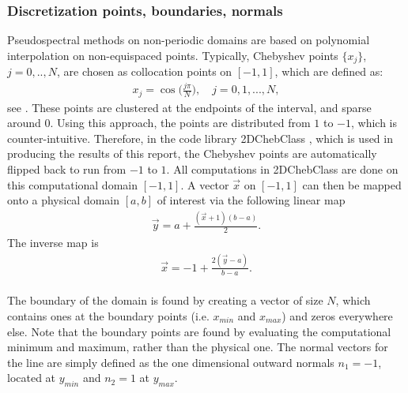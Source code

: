 \subsubsection{Discretization points, boundaries, normals}
Pseudospectral methods on non-periodic domains are based on polynomial interpolation on non-equispaced points.  
Typically, Chebyshev points $\{x_j\}$, $j = 0,..,N$, are chosen as collocation points on $[-1,1]$, which are defined as:
\begin{align}\label{defChebyshevPoints}
	x_j= \cos\bigg(\frac{j \pi}{N}\bigg), \quad j=0,1,...,N,
\end{align}	
see \cite{bibTrefethen}.
These points are clustered at the endpoints of the interval, and sparse around $0$. Using this approach, the points are distributed from $1$ to $-1$, which is counter-intuitive. Therefore, in the code library 2DChebClass \cite{GoddardPseudospectralCode1}, which is used in producing the results of this report, the Chebyshev points are automatically flipped back to run from $-1$ to $1$. All computations in 2DChebClass are done on this computational domain $[-1,1]$. A vector $\vec x$ on $[-1,1]$ can then be mapped onto a physical domain $[a,b]$ of interest via the following linear map
\begin{align}\label{eq:linearmap}
\vec y = a + \frac{(\vec x+1)(b-a)}{2}.  
\end{align}
The inverse map is 
\begin{align}\label{eq:invlinearmap}
\vec x = -1 + \frac{2(\vec y-a)}{b-a}.
\end{align}
\\
The boundary of the domain is found by creating a vector of size $N$, which contains ones at the boundary points (i.e. $x_{min}$ and $x_{max}$) and zeros everywhere else. Note that the boundary points are found by evaluating the computational minimum and maximum, rather than the physical one.
The normal vectors for the line are simply defined as the one dimensional outward normals $n_1 = -1$, located at $y_{min}$ and $n_2 = 1$ at $y_{max}$. 
